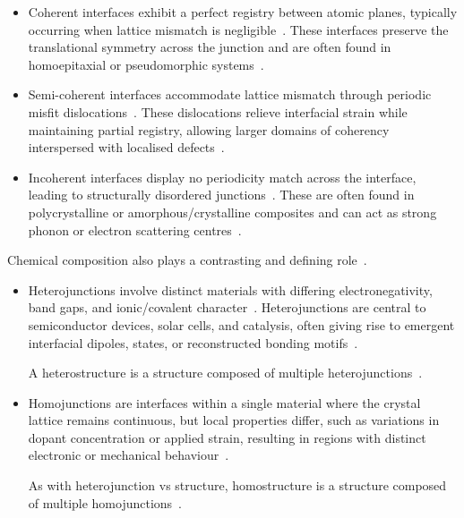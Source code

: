\begin{itemize}
    \item Coherent interfaces exhibit a perfect registry between atomic planes, typically occurring when lattice mismatch is negligible~\nocite{cited_below}.
    These interfaces preserve the translational symmetry across the junction and are often found in homoepitaxial or pseudomorphic systems~\cite{Davies2024-ju}. %
    \item Semi-coherent interfaces accommodate lattice mismatch through periodic misfit dislocations~\nocite{cited_below}.
    These dislocations relieve interfacial strain while maintaining partial registry, allowing larger domains of coherency interspersed with localised defects~\cite{Davies2024-ju}. %
    \item Incoherent interfaces display no periodicity match across the interface, leading to structurally disordered junctions~\nocite{cited_below}.
    These are often found in polycrystalline or amorphous/crystalline composites and can act as strong phonon or electron scattering centres~\cite{Davies2024-ju}. %
\end{itemize}

\label{chemical_contrast_hetero_homo} Chemical composition also plays a contrasting and defining role~\nocite{}.

\begin{itemize}
    \item Heterojunctions involve distinct materials with differing electronegativity, band gaps, and ionic/covalent character~\nocite{}.
    Heterojunctions are central to semiconductor devices, solar cells, and catalysis, often giving rise to emergent interfacial dipoles, states, or reconstructed bonding motifs~\nocite{}.

    A heterostructure is a structure composed of multiple heterojunctions~\nocite{}.
    \item Homojunctions are interfaces within a single material where the crystal lattice remains continuous, but local properties differ, such as variations in dopant concentration or applied strain, resulting in regions with distinct electronic or mechanical behaviour~\nocite{}.

    As with heterojunction vs structure, homostructure is a structure composed of multiple homojunctions~\nocite{}.
\end{itemize}

